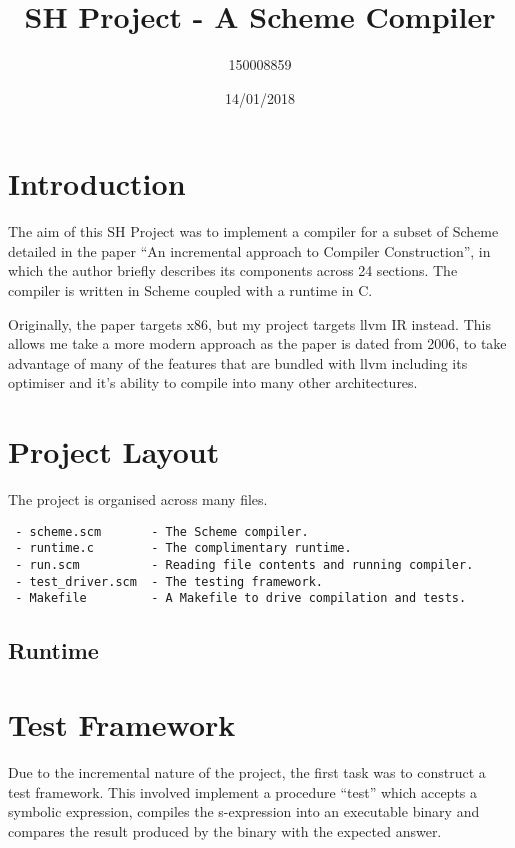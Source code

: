 \documentclass{article}
\title{SH Project - A Scheme Compiler}
\date{14/01/2018}
\author{150008859}
\begin{document}
\maketitle
\newpage

\section{Introduction}

The aim of this SH Project was to implement a compiler for a subset of Scheme detailed in the paper ``An incremental approach to Compiler Construction'', in which the author briefly describes its components across 24 sections. The compiler is written in Scheme coupled with a runtime in C.

Originally, the paper targets x86, but my project targets llvm IR instead. This allows me take a more modern approach as the paper is dated from 2006, to take advantage of many of the features that are bundled with llvm including its optimiser and it's ability to compile into many other architectures. 

\section{Project Layout}

The project is organised across many files.

\begin{verbatim}
 - scheme.scm       - The Scheme compiler.
 - runtime.c        - The complimentary runtime.
 - run.scm          - Reading file contents and running compiler.
 - test_driver.scm  - The testing framework.
 - Makefile         - A Makefile to drive compilation and tests. 
\end{verbatim}


\subsection{Runtime}



\section{Test Framework}

Due to the incremental nature of the project, the first task was to construct a test framework. This involved implement a procedure ``test'' which accepts a symbolic expression, compiles the s-expression into an executable binary and compares the result produced by the binary with the expected answer.
\end{document}
